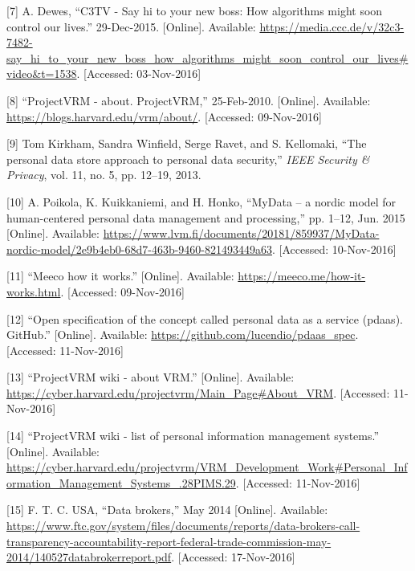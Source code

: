 \documentclass[12pt,english,a4paper,titlepage,cleardoublepage=empty,dottedtoc]{report}
\begin{document}
\hypertarget{ref-video_2015_big-data-and-deep-learning_discrimination}{}
{[}7{]} A. Dewes, ``C3TV - Say hi to your new boss: How algorithms might
soon control our lives.'' 29-Dec-2015. {[}Online{]}. Available:
\url{https://media.ccc.de/v/32c3-7482-say_hi_to_your_new_boss_how_algorithms_might_soon_control_our_lives\#video\&t=1538}.
{[}Accessed: 03-Nov-2016{]}

\hypertarget{ref-web_2010_projectvrm_about}{}
{[}8{]} ``ProjectVRM - about. ProjectVRM,'' 25-Feb-2010. {[}Online{]}.
Available: \url{https://blogs.harvard.edu/vrm/about/}. {[}Accessed:
09-Nov-2016{]}

\hypertarget{ref-paper_2013_the-personal-data-store-approach-to-personal-data-security_2013}{}
{[}9{]} Tom Kirkham, Sandra Winfield, Serge Ravet, and S. Kellomaki,
``The personal data store approach to personal data security,''
\emph{IEEE Security \& Privacy}, vol. 11, no. 5, pp. 12--19, 2013.

\hypertarget{ref-whitepaper_2014_mydata-a-nordic-model-for-human-centered-personal-data-management-and-processing}{}
{[}10{]} A. Poikola, K. Kuikkaniemi, and H. Honko, ``MyData -- a nordic
model for human-centered personal data management and processing,'' pp.
1--12, Jun. 2015 {[}Online{]}. Available:
\url{https://www.lvm.fi/documents/20181/859937/MyData-nordic-model/2e9b4eb0-68d7-463b-9460-821493449a63}.
{[}Accessed: 10-Nov-2016{]}

\hypertarget{ref-web_2016_meeco-how-it-works}{}
{[}11{]} ``Meeco how it works.'' {[}Online{]}. Available:
\url{https://meeco.me/how-it-works.html}. {[}Accessed: 09-Nov-2016{]}

\hypertarget{ref-repo_2016_pdaas-spec}{}
{[}12{]} ``Open specification of the concept called personal data as a
service (pdaas). GitHub.'' {[}Online{]}. Available:
\url{https://github.com/lucendio/pdaas_spec}. {[}Accessed:
11-Nov-2016{]}

\hypertarget{ref-web_2010_projectvrm-wiki_about-vrm}{}
{[}13{]} ``ProjectVRM wiki - about VRM.'' {[}Online{]}. Available:
\url{https://cyber.harvard.edu/projectvrm/Main_Page\#About_VRM}.
{[}Accessed: 11-Nov-2016{]}

\hypertarget{ref-web_2010_projectvrm-wiki_pims-example-list}{}
{[}14{]} ``ProjectVRM wiki - list of personal information management
systems.'' {[}Online{]}. Available:
\url{https://cyber.harvard.edu/projectvrm/VRM_Development_Work\#Personal_Information_Management_Systems_.28PIMS.29}.
{[}Accessed: 11-Nov-2016{]}

\hypertarget{ref-report_2014_data-brokers}{}
{[}15{]} F. T. C. USA, ``Data brokers,'' May 2014 {[}Online{]}.
Available:
\url{https://www.ftc.gov/system/files/documents/reports/data-brokers-call-transparency-accountability-report-federal-trade-commission-may-2014/140527databrokerreport.pdf}.
{[}Accessed: 17-Nov-2016{]}
\end{document}
